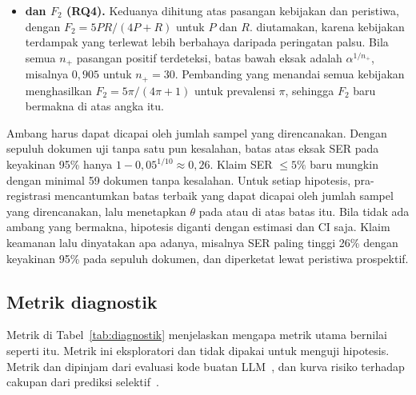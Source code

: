 \begin{itemize}[leftmargin=*,nosep]
  \item \textbf{ dan $F_2$ (RQ4).} Keduanya dihitung atas pasangan kebijakan dan peristiwa, dengan $F_2 = 5PR/(4P+R)$ untuk  $P$ dan  $R$.  diutamakan, karena kebijakan terdampak yang terlewat lebih berbahaya daripada peringatan palsu. Bila semua $n_+$ pasangan positif terdeteksi, batas bawah eksak  adalah $\alpha^{1/n_+}$, misalnya $0{,}905$ untuk $n_+ = 30$. Pembanding yang menandai semua kebijakan menghasilkan $F_2 = 5\pi/(4\pi+1)$ untuk prevalensi $\pi$, sehingga $F_2$ baru bermakna di atas angka itu.
\end{itemize}

Ambang harus dapat dicapai oleh jumlah sampel yang direncanakan. Dengan sepuluh dokumen uji tanpa satu pun kesalahan, batas atas eksak SER pada keyakinan 95\% hanya $1-0{,}05^{1/10} \approx 0{,}26$. Klaim SER $\leq 5\%$ baru mungkin dengan minimal 59 dokumen tanpa kesalahan. Untuk setiap hipotesis, pra-registrasi mencantumkan batas terbaik yang dapat dicapai oleh jumlah sampel yang direncanakan, lalu menetapkan $\theta$ pada atau di atas batas itu. Bila tidak ada ambang yang bermakna, hipotesis diganti dengan estimasi dan CI saja. Klaim keamanan lalu dinyatakan apa adanya, misalnya SER paling tinggi 26\% dengan keyakinan 95\% pada sepuluh dokumen, dan diperketat lewat peristiwa prospektif.


\subsection{Metrik diagnostik}
\label{subsec:diagnostik}

Metrik di Tabel~\ref{tab:diagnostik} menjelaskan mengapa metrik utama bernilai seperti itu. Metrik ini eksploratori dan tidak dipakai untuk menguji hipotesis. Metrik  dan  dipinjam dari evaluasi kode buatan LLM~\cite{chen2021evaluating,li2022alphacode}, dan kurva risiko terhadap cakupan dari prediksi selektif~\cite{geifman2017selective}.

